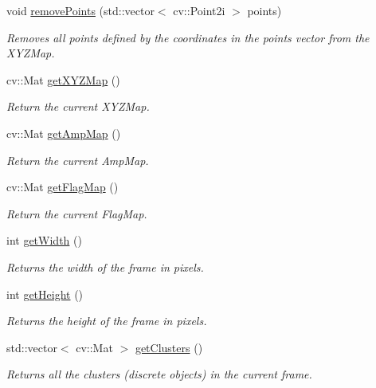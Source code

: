 \begin{DoxyCompactItemize}
void \hyperlink{class_depth_camera_a8f38ced63dcfb0c4c56cb7d4e940bcd8}{remove\+Points} (std\+::vector$<$ cv\+::\+Point2i $>$ points)
\begin{DoxyCompactList}\small\item\em Removes all points defined by the coordinates in the points vector from the X\+Y\+Z\+Map. \end{DoxyCompactList}\item 
\hypertarget{class_depth_camera_a0c295c5a0696550f453b1c8cd0fcb188}{}\label{class_depth_camera_a0c295c5a0696550f453b1c8cd0fcb188} 
cv\+::\+Mat \hyperlink{class_depth_camera_a0c295c5a0696550f453b1c8cd0fcb188}{get\+X\+Y\+Z\+Map} ()
\begin{DoxyCompactList}\small\item\em Return the current X\+Y\+Z\+Map. \end{DoxyCompactList}\item 
\hypertarget{class_depth_camera_a8211704726722a1be3d9b2aeeeffcf09}{}\label{class_depth_camera_a8211704726722a1be3d9b2aeeeffcf09} 
cv\+::\+Mat \hyperlink{class_depth_camera_a8211704726722a1be3d9b2aeeeffcf09}{get\+Amp\+Map} ()
\begin{DoxyCompactList}\small\item\em Return the current Amp\+Map. \end{DoxyCompactList}\item 
\hypertarget{class_depth_camera_a348cd41559a416a61780073f5369b032}{}\label{class_depth_camera_a348cd41559a416a61780073f5369b032} 
cv\+::\+Mat \hyperlink{class_depth_camera_a348cd41559a416a61780073f5369b032}{get\+Flag\+Map} ()
\begin{DoxyCompactList}\small\item\em Return the current Flag\+Map. \end{DoxyCompactList}\item 
\hypertarget{class_depth_camera_a59fa917e64c6c67248787ba2cba3654b}{}\label{class_depth_camera_a59fa917e64c6c67248787ba2cba3654b} 
int \hyperlink{class_depth_camera_a59fa917e64c6c67248787ba2cba3654b}{get\+Width} ()
\begin{DoxyCompactList}\small\item\em Returns the width of the frame in pixels. \end{DoxyCompactList}\item 
int \hyperlink{class_depth_camera_a430070d82a2bfc2583fd8290ca7bb8d6}{get\+Height} ()
\begin{DoxyCompactList}\small\item\em Returns the height of the frame in pixels. \end{DoxyCompactList}\item 
std\+::vector$<$ cv\+::\+Mat $>$ \hyperlink{class_depth_camera_a18d88b8df2a08c9c167207fea587d66e}{get\+Clusters} ()
\begin{DoxyCompactList}\small\item\em Returns all the clusters (discrete objects) in the current frame. \end{DoxyCompactList}\end{DoxyCompactItemize}
